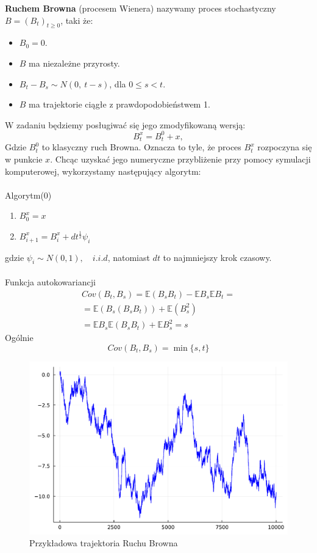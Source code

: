 \documentclass{article}
\theoremstyle{break}
\numberwithin{equation}{subsection}
\numberwithin{figure}{section}
\begin{document}
\textbf{Ruchem Browna} (procesem Wienera) nazywamy proces stochastyczny $B = (B_t)_{t\geq0}$, taki że:
\begin{itemize}
	\item $B_0=0$.
	\item $B$ ma niezależne przyrosty.
	\item $B_t-B_s\sim N(0,~t-s)$, dla $0\leq s<t$.
	\item $B$ ma trajektorie ciągłe z prawdopodobieństwem 1.
\end{itemize}
W zadaniu będziemy posługiwać się jego zmodyfikowaną wersją:
$$B_t^x=B_t^0+x,$$
Gdzie $B_t^0$ to klasyczny ruch Browna. Oznacza to tyle, że proces $B_t^x$ rozpoczyna się w punkcie $x$. Chcąc uzyskać jego numeryczne przybliżenie przy pomocy symulacji komputerowej, wykorzystamy następujący algorytm:
\\ \\
Algorytm(0)
\begin{enumerate}
	\item $B_0^x=x$
	\item $B_{i+1}^x=B_{i}^x+dt^{\frac{1}{2}}\psi_i$
\end{enumerate}
gdzie $\psi_i\sim N(0,1),\quad i.i.d$, natomiast $dt$ to najmniejszy krok czasowy.\\ \\ 

Funkcja autokowariancji
\begin{gather}
	Cov(B_t,B_s)=\mathbb{E}(B_sB_t)-\mathbb{E}B_s\mathbb{E}B_t=\\
	=\mathbb{E}(B_s(B_sB_t))+\mathbb{E}(B_s^2)\\
	=\mathbb{E}B_s\mathbb{E}(B_sB_t)+\mathbb{E}B_s^2=s
\end{gather}
Ogólnie
$$Cov(B_t,B_s)=\min\{s,t\}$$

\begin{figure}[H]
	\center
	\includegraphics[scale=0.35]{przyklad_trajektorii.pdf}
	\caption{Przykładowa trajektoria Ruchu Browna}
	\label{fig: pojedyncza_browna}
\end{figure}
\end{document}
